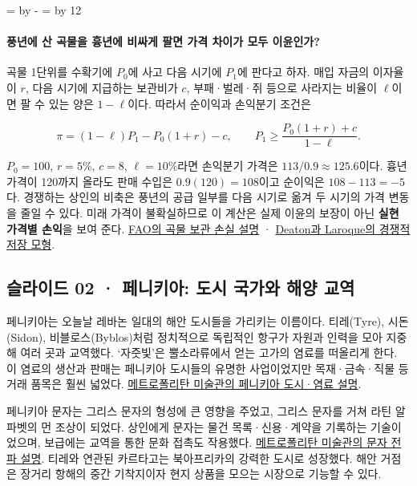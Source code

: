 \documentclass[10pt,a4paper]{article}
\newcommand{\ReserveQuestionSpace}{%
  \par\begingroup
  \dimen0=\pagegoal \advance\dimen0 by -\pagetotal
  \dimen2=\baselineskip \multiply\dimen2 by 12
  \ifdim\dimen0<\dimen2 \newpage\fi
  \endgroup}
\begin{document}
\ReserveQuestionSpace
\paragraph{풍년에 산 곡물을 흉년에 비싸게 팔면 가격 차이가 모두 이윤인가?}
곡물 1단위를 수확기에 $P_0$에 사고 다음 시기에 $P_1$에 판다고 하자. 매입 자금의 이자율이 $r$, 다음 시기에 지급하는 보관비가 $c$, 부패·벌레·쥐 등으로 사라지는 비율이 $\ell$이면 팔 수 있는 양은 $1-\ell$이다. 따라서 순이익과 손익분기 조건은\par

\[
\pi=(1-\ell)P_1-P_0(1+r)-c,\qquad
P_1\geq\frac{P_0(1+r)+c}{1-\ell}.
\]

$P_0=100$, $r=5\%$, $c=8$, $\ell=10\%$라면 손익분기 가격은 $113/0.9\approx125.6$이다. 흉년 가격이 120까지 올라도 판매 수입은 $0.9(120)=108$이고 순이익은 $108-113=-5$다. 경쟁하는 상인의 비축은 풍년의 공급 일부를 다음 시기로 옮겨 두 시기의 가격 변동을 줄일 수 있다. 미래 가격이 불확실하므로 이 계산은 실제 이윤의 보장이 아닌 \textbf{실현 가격별 손익}을 보여 준다. \href{https://www.fao.org/4/x5065e/x5065E05.htm}{FAO의 곡물 보관 손실 설명} · \href{https://deaton.scholar.princeton.edu/publications/competitive-storage-and-commodity-price-dynamics}{Deaton과 Laroque의 경쟁적 저장 모형}.\par

\subsection{슬라이드 02 · 페니키아: 도시 국가와 해양 교역}
페니키아는 오늘날 레바논 일대의 해안 도시들을 가리키는 이름이다. 티레(Tyre), 시돈(Sidon), 비블로스(Byblos)처럼 정치적으로 독립적인 항구가 자원과 인력을 모아 지중해 여러 곳과 교역했다. ‘자줏빛’은 뿔소라류에서 얻는 고가의 염료를 떠올리게 한다. 이 염료의 생산과 판매는 페니키아 도시들의 유명한 사업이었지만 목재·금속·직물 등 거래 품목은 훨씬 넓었다. \href{https://www.metmuseum.org/exhibitions/listings/2014/assyria-to-iberia/blog/posts/phoenicia-and-the-bible}{메트로폴리탄 미술관의 페니키아 도시·염료 설명}.\par

페니키아 문자는 그리스 문자의 형성에 큰 영향을 주었고, 그리스 문자를 거쳐 라틴 알파벳의 먼 조상이 되었다. 상인에게 문자는 물건 목록·신용·계약을 기록하는 기술이었으며, 보급에는 교역을 통한 문화 접촉도 작용했다. \href{https://www.metmuseum.org/exhibitions/listings/2014/assyria-to-iberia/blog/posts/alphabet}{메트로폴리탄 미술관의 문자 전파 설명}. 티레와 연관된 카르타고는 북아프리카의 강력한 도시로 성장했다. 해안 거점은 장거리 항해의 중간 기착지이자 현지 상품을 모으는 시장으로 기능할 수 있다.\par
\end{document}

